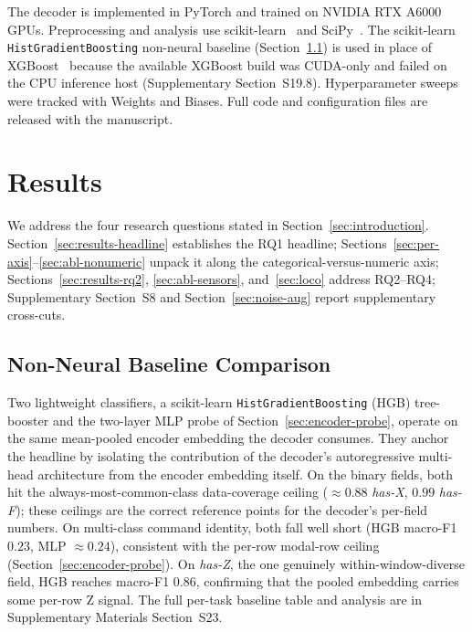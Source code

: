 \documentclass[sensors,article,submit,moreauthors,pdftex]{Definitions/mdpi}
\begin{document}
The decoder is implemented in PyTorch and trained on NVIDIA RTX A6000 GPUs. Preprocessing and analysis use scikit-learn~\cite{pedregosa2011sklearn} and SciPy~\cite{virtanen2020scipy}. The scikit-learn \texttt{HistGradientBoosting} non-neural baseline (Section~\ref{sec:results-baseline}) is used in place of XGBoost~\cite{chen2016xgboost} because the available XGBoost build was CUDA-only and failed on the CPU inference host (Supplementary Section~S19.8). Hyperparameter sweeps were tracked with Weights and Biases. Full code and configuration files are released with the manuscript.

\section{Results}
\label{sec:experiments}

We address the four research questions stated in Section~\ref{sec:introduction}. Section~\ref{sec:results-headline} establishes the RQ1 headline; Sections~\ref{sec:per-axis}--\ref{sec:abl-nonumeric} unpack it along the categorical-versus-numeric axis; Sections~\ref{sec:results-rq2}, \ref{sec:abl-sensors}, and~\ref{sec:loco} address RQ2--RQ4; Supplementary Section~S8 and Section~\ref{sec:noise-aug} report supplementary cross-cuts.

\subsection{Non-Neural Baseline Comparison}
\label{sec:results-baseline}

Two lightweight classifiers, a scikit-learn \texttt{HistGradientBoosting} (HGB) tree-booster and the two-layer MLP probe of Section~\ref{sec:encoder-probe}, operate on the same mean-pooled encoder embedding the decoder consumes. They anchor the headline by isolating the contribution of the decoder's autoregressive multi-head architecture from the encoder embedding itself. On the binary fields, both hit the always-most-common-class data-coverage ceiling ($\approx\!0.88$ \emph{has-X}, $0.99$ \emph{has-F}); these ceilings are the correct reference points for the decoder's per-field numbers. On multi-class command identity, both fall well short (HGB macro-F1 $0.23$, MLP $\approx\!0.24$), consistent with the per-row modal-row ceiling (Section~\ref{sec:encoder-probe}). On \emph{has-Z}, the one genuinely within-window-diverse field, HGB reaches macro-F1 $0.86$, confirming that the pooled embedding carries some per-row Z signal. The full per-task baseline table and analysis are in Supplementary Materials Section~S23.
\end{document}
